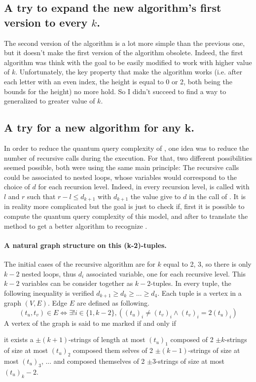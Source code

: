 \subsection{A try to expand the new
    algorithm's first version to every $k$.}

The second version of the algorithm is a lot more simple than the previous one,
but it doesn't make the first version of the algorithm obsolete. Indeed, the
first algorithm was think with the goal to be easily modified to work with higher
value of $k$. Unfortunately, the key property that make the algorithm works
(i.e. after each letter with an even index, the height is equal to 0 or 2, both
being the bounds for the height) no more hold. So I didn't succeed to find a way
to generalized to greater value of $k$.

\subsection{A try for a new algorithm for any k.}
\label{subsec:dicho}

In order to reduce the quantum query complexity of , one idea was
to reduce the number of recursive calls during the execution. For that,
two different possibilities seemed possible, both were using the same
main principle: The recursive calls could be associated to nested loops,
whose variables would correspond to the choice of $d$ for each recursion level.
Indeed, in every recursion level,  is called with $l$ and $r$ such that
$r-l\leq d_{k+1}$ with $d_{k+1}$ the value give to $d$ in the call of .
It is in reality more complicated but the goal is just to check if,
first it is possible to compute the quantum query complexity
of this model, and after to translate the method to get a better algorithm to
recognize .

\paragraph*{A natural graph structure on this (k-2)-tuples.} The initial
cases of the recursive algorithm  are for $k$ equal to 2, 3, so there
is only $k-2$ nested loops, thus $d_i$
associated variable, one for each recursive level. This $k-2$ variables can
be consider together as $k-2$-tuples. In every tuple, the following inequality
is verified $ d_{k+1} \geq d_k \geq \ldots \geq d_4$. Each tuple is a vertex
in a graph $(V,E)$. Edge $E$ are defined as following.
\[ (t_u,t_v) \in E \Leftrightarrow \exists ! i \in \{1, k-2\}, \left( (t_u)_i
    \neq (t_v)_i \land (t_v)_i = 2(t_u)_i\right)\]
A vertex of the graph is said to me marked if and only if
\begin{center}
    \begin{minipage}{.8\textwidth}
        it exists a $\pm (k+1)$-strings
        of length at most $(t_u)_1$ composed of 2 $\pm k$-strings of size at most
        $(t_u)_2$ composed them selves of 2 $\pm (k-1)$-strings of size at most
        $(t_u)_3$, ... and composed themselves of  2 $\pm 3$-strings of size at most
        $(t_u)_k-2$.
    \end{minipage}
\end{center}

